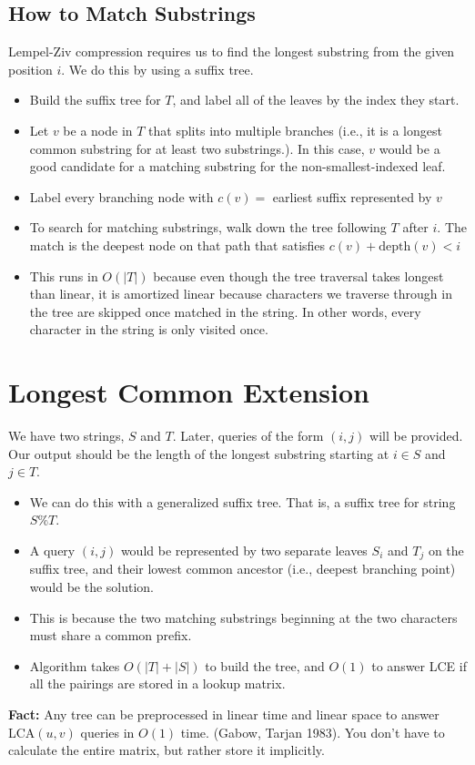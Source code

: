 \documentclass[10pt]{article}
\begin{document}
\subsection*{How to Match Substrings}
Lempel-Ziv compression requires us to find the longest substring from the given position $i$.  We do this by using a suffix tree.
\begin{itemize}
	\item Build the suffix tree for $T$, and label all of the leaves by the index they start.
	\item Let $v$ be a node in $T$ that splits into multiple branches (i.e., it is a longest common substring for at least two substrings.).  In this case, $v$ would be a good candidate for a matching substring for the non-smallest-indexed leaf.
	\item Label every branching node with $c(v) = $ earliest suffix represented by $v$
	\item To search for matching substrings, walk down the tree following $T$ after $i$.  The match is the deepest node on that path that satisfies $c(v) + \text{depth}(v) < i$
	\item This runs in $O(|T|)$ because even though the tree traversal takes longest than linear, it is amortized linear because characters we traverse through in the tree are skipped once matched in the string.  In other words, every character in the string is only visited once.
\end{itemize}

\section*{Longest Common Extension}
We have two strings, $S$ and $T$.  Later, queries of the form $(i, j)$ will be provided.  Our output should be the length of the longest substring starting at $i \in S$ and $j \in T$.
\begin{itemize}
	\item We can do this with a generalized suffix tree.  That is, a suffix tree for string $S\%T$.
	\item A query $(i, j)$ would be represented by two separate leaves $S_i$ and $T_j$ on the suffix tree, and their lowest common ancestor (i.e., deepest branching point) would be the solution.
	\item This is because the two matching substrings beginning at the two characters must share a common prefix.
	\item Algorithm takes $O(|T| + |S|)$ to build the tree, and $O(1)$ to answer LCE if all the pairings are stored in a lookup matrix.
\end{itemize}
\textbf{Fact:} Any tree can be preprocessed in linear time and linear space to answer LCA$(u, v)$ queries in $O(1)$ time.  (Gabow, Tarjan 1983).  You don't have to calculate the entire matrix, but rather store it implicitly.
\end{document}
